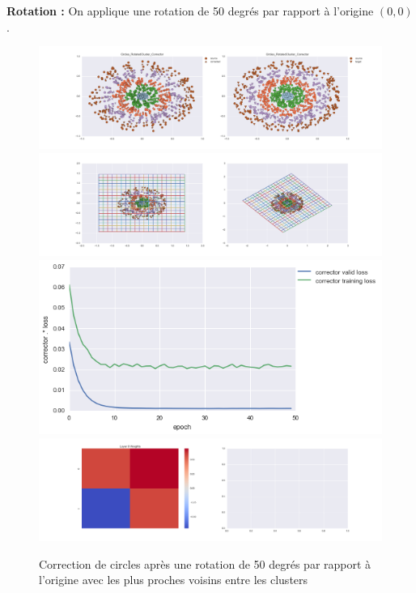 
{\Large \textbf{Rotation :}} On applique une rotation de 50 degrés par rapport à l'origine $(0,0)$.

\begin{figure}[H] %
\centering
\includegraphics[width=\linewidth]{fig/24-05-2016/circles/Circles_RotatedCluster_Corrector-DATA.png}
\includegraphics[width=\linewidth]{fig/24-05-2016/circles/Circles_RotatedCluster_Corrector-GridCheck.png}
\includegraphics[width=0.45\linewidth]{fig/24-05-2016/circles/Circles_RotatedCluster_Corrector-Learning_curve.png}
\includegraphics[width=\linewidth]{fig/24-05-2016/circles/Circles_RotatedCluster_Corrector-W.png}
\caption{Correction de circles après une rotation de 50 degrés par rapport à l'origine avec les plus proches voisins entre les clusters}
\label{fig:recap-circles-rot-cluster}
\end{figure}

